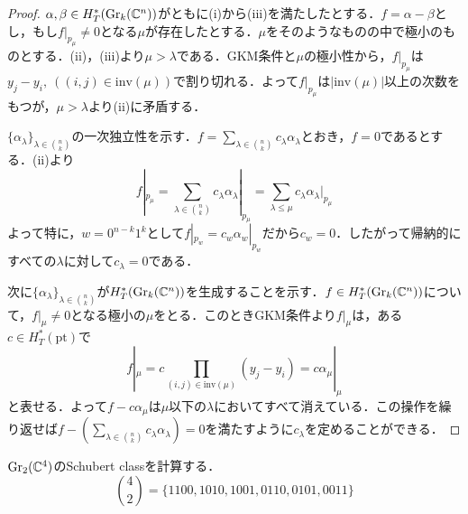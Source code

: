 \begin{proof}
  $\alpha,\beta\in H^*_T(\text{Gr}_k(\mathbb{C}^n))$がともに(i)から(iii)を満たしたとする．$f=\alpha-\beta$とし，もし$f|_{p_\mu}\neq 0$となる$\mu$が存在したとする．$\mu$をそのようなものの中で極小のものとする．(ii)，(iii)より$\mu > \lambda$である．GKM条件と$\mu$の極小性から，$f|_{p_\mu}$は$y_j - y_i,\:((i,j)\in\text{inv}(\mu))$で割り切れる．よって$f|_{p_\mu}$は$|\text{inv}(\mu)|$以上の次数をもつが，$\mu > \lambda$より(ii)に矛盾する．

  $\{\alpha_\lambda\}_{\lambda\in\binom{n}{k}}$の一次独立性を示す．$f=\sum_{\lambda\in\binom{n}{k}}c_\lambda\alpha_\lambda$とおき，$f=0$であるとする．(ii)より
  \[
  f|_{p_\mu}
  =\sum_{\lambda\in\binom{n}{k}}c_\lambda\alpha_\lambda|_{p_\mu}
  =\sum_{\lambda \leq \mu}c_\lambda\alpha_\lambda|_{p_\mu}
  \]
  よって特に，$w=0^{n-k}1^k$として$f|_{p_w}=c_w\alpha_w|_{p_w}$だから$c_w = 0$．したがって帰納的にすべての$\lambda$に対して$c_\lambda = 0$である．

  次に$\{\alpha_\lambda\}_{\lambda\in\binom{n}{k}}$が$H^*_T(\text{Gr}_k(\mathbb{C}^n))$を生成することを示す．$f\in H^*_T(\text{Gr}_k(\mathbb{C}^n))$について，$f|_\mu \neq 0$となる極小の$\mu$をとる．このときGKM条件より$f|_\mu$は，ある$c\in H^*_T(\text{pt})$で
  \[
  f|_\mu = c\prod_{(i,j)\in\text{inv}(\mu)}(y_j-y_i) = c \alpha_\mu|_\mu
  \]
  と表せる．よって$f - c\alpha_\mu$は$\mu$以下の$\lambda$においてすべて消えている．この操作を繰り返せば$f - (\sum_{\lambda\in\binom{n}{k}}c_\lambda\alpha_\lambda)=0$を満たすように$c_\lambda$を定めることができる．
\end{proof}

\begin{eg}
  $\text{Gr}_2(\mathbb{C}^4)$のSchubert classを計算する．
  \[
  \binom{4}{2} = \{1100,1010,1001,0110,0101,0011\}
  \]

\end{eg}